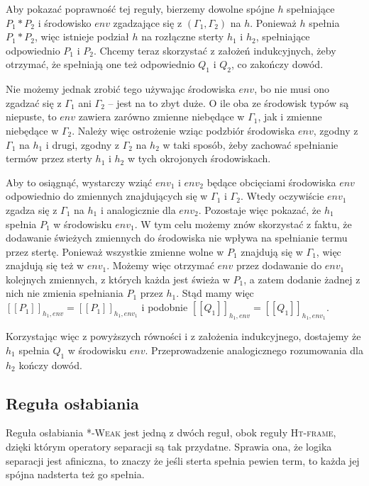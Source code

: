 \documentclass[]{pracamgr}
\renewcommand \| {\hspace{0.75em} | \hspace{0.75em} }
\renewcommand \[ {[\![}
\renewcommand \] {]\!]}
\theoremstyle{definition}
\begin{document}
Aby pokazać poprawność tej reguły, bierzemy dowolne spójne $h$ spełniające $P_1 * P_2$ i środowisko
$env$ zgadzające się z $(\Gamma_1, \Gamma_2)$ na $h$.
Ponieważ $h$ spełnia $P_1 * P_2$, więc istnieje podział $h$ na rozłączne sterty $h_1$ i $h_2$,
spełniające odpowiednio $P_1$ i $P_2$. Chcemy teraz skorzystać z założeń indukcyjnych, żeby
otrzymać, że spełniają one też odpowiednio $Q_1$ i $Q_2$, co zakończy dowód.

Nie możemy jednak zrobić tego używając środowiska $env$, bo nie musi ono zgadzać się z $\Gamma_1$
ani $\Gamma_2$ -- jest na to zbyt duże. O ile oba ze środowisk typów są niepuste, to $env$ zawiera
zarówno zmienne niebędące w $\Gamma_1$, jak i zmienne niebędące w $\Gamma_2$.
Należy więc ostrożenie wziąc podzbiór środowiska $env$, zgodny z $\Gamma_1$ na $h_1$ i drugi,
zgodny z $\Gamma_2$ na $h_2$ w taki sposób, żeby zachować spełnianie termów przez sterty
$h_1$ i $h_2$ w tych okrojonych środowiskach.

Aby to osiągnąć, wystarczy wziąć $env_1$ i $env_2$ będące obcięciami środowiska $env$ odpowiednio do
zmiennych znajdujących się w $\Gamma_1$ i $\Gamma_2$.
Wtedy oczywiście $env_1$ zgadza się z $\Gamma_1$ na $h_1$ i analogicznie dla $env_2$.
Pozostaje więc pokazać, że $h_1$ spełnia $P_1$ w środowisku $env_1$.
W tym celu możemy znów skorzystać z faktu, że dodawanie świeżych zmiennych do środowiska nie
wpływa na spełnianie termu przez stertę. Ponieważ wszystkie zmienne wolne w $P_1$ znajdują
się w $\Gamma_1$, więc znajdują się też w $env_1$. Możemy więc otrzymać $env$ przez dodawanie
do $env_1$ kolejnych zmiennych, z których każda jest świeża w $P_1$, a zatem dodanie żadnej z nich
nie zmienia spełniania $P_1$ przez $h_1$. Stąd mamy więc
$\[ P_1 \]_{h_1, env} = \[ P_1 \]_{h_1, env_1}$ i podobnie
$\[ Q_1 \]_{h_1, env} = \[ Q_1 \]_{h_1, env_1}$.

Korzystając więc z powyższych równości i z założenia indukcyjnego, dostajemy że $h_1$ spełnia $Q_1$
w środowisku $env$. Przeprowadzenie analogicznego rozumowania dla $h_2$ kończy dowód.

\subsection{Reguła osłabiania}
Reguła osłabiania \textsc{*-Weak} jest jedną z dwóch reguł, obok reguły \textsc{Ht-frame},
dzięki którym operatory separacji są tak przydatne.
Sprawia ona, że logika separacji jest afiniczna, to znaczy że jeśli sterta spełnia pewien term,
to każda jej spójna nadsterta też go spełnia.
\end{document}
